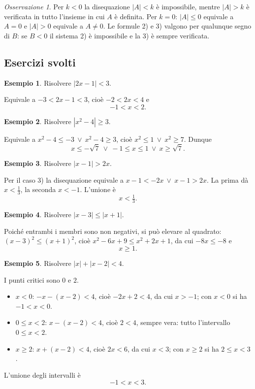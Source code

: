 \documentclass[12pt,a4paper,openany]{book}
\theoremstyle{definition}
\newtheorem{esempio}{Esempio}[section]
\theoremstyle{plain}
\theoremstyle{remark}
\newtheorem*{osservazione}{Osservazione}
\newcommand{\abs}[1]{\left|#1\right|}
\begin{document}
\begin{osservazione}
Per $k<0$ la disequazione $\abs{A}<k$ è impossibile, mentre $\abs{A}>k$ è verificata in tutto l'insieme in cui $A$ è definita. Per $k=0$: $\abs{A}\le 0$ equivale a $A=0$ e $\abs{A}>0$ equivale a $A\neq 0$. Le formule 2) e 3) valgono per qualunque segno di $B$: se $B<0$ il sistema 2) è impossibile e la 3) è sempre verificata.
\end{osservazione}

\subsection*{Esercizi svolti}

\begin{esempio}
Risolvere $\abs{2x-1}<3$.

Equivale a $-3<2x-1<3$, cioè $-2<2x<4$ e
\[
-1<x<2.
\]
\end{esempio}

\begin{esempio}
Risolvere $\abs{x^2-4}\ge 3$.

Equivale a $x^2-4\le -3\ \lor\ x^2-4\ge 3$, cioè $x^2\le 1\ \lor\ x^2\ge 7$. Dunque
\[
x\le -\sqrt7\ \lor\ -1\le x\le 1\ \lor\ x\ge\sqrt7.
\]
\end{esempio}

\begin{esempio}
Risolvere $\abs{x-1}>2x$.

Per il caso 3) la disequazione equivale a $x-1<-2x\ \lor\ x-1>2x$. La prima dà $x<\tfrac13$, la seconda $x<-1$. L'unione è
\[
x<\tfrac13.
\]
\end{esempio}

\begin{esempio}
Risolvere $\abs{x-3}\le\abs{x+1}$.

Poiché entrambi i membri sono non negativi, si può elevare al quadrato: $(x-3)^2\le(x+1)^2$, cioè $x^2-6x+9\le x^2+2x+1$, da cui $-8x\le -8$ e
\[
x\ge 1.
\]
\end{esempio}

\begin{esempio}
Risolvere $\abs{x}+\abs{x-2}<4$.

I punti critici sono $0$ e $2$.
\begin{itemize}
\item $x<0$: $-x-(x-2)<4$, cioè $-2x+2<4$, da cui $x>-1$; con $x<0$ si ha $-1<x<0$.
\item $0\le x<2$: $x-(x-2)<4$, cioè $2<4$, sempre vera: tutto l'intervallo $0\le x<2$.
\item $x\ge 2$: $x+(x-2)<4$, cioè $2x<6$, da cui $x<3$; con $x\ge 2$ si ha $2\le x<3$.
\end{itemize}
L'unione degli intervalli è
\[
-1<x<3.
\]
\end{esempio}
\end{document}
